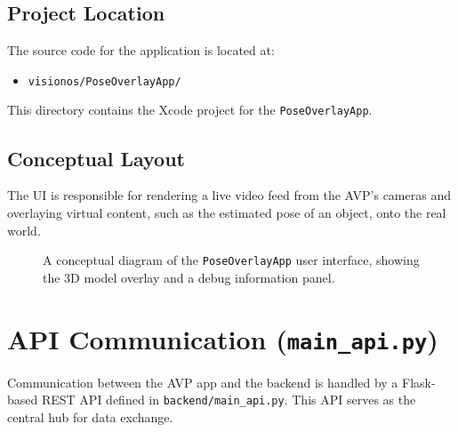 ﻿\documentclass{article}
\newcommand{\filepath}[1]{\texttt{\small #1}}
\begin{document}
\subsection{Project Location}
The source code for the application is located at:
\begin{itemize}
    \item \filepath{visionos/PoseOverlayApp/}
\end{itemize}
This directory contains the Xcode project for the \texttt{PoseOverlayApp}.

\subsection{Conceptual Layout}
The UI is responsible for rendering a live video feed from the AVP's cameras and overlaying virtual content, such as the estimated pose of an object, onto the real world.

\begin{figure}[h!]
\centering
{}
\caption{A conceptual diagram of the \texttt{PoseOverlayApp} user interface, showing the 3D model overlay and a debug information panel.}
\label{fig:ui_concept}
\end{figure}

\section{API Communication (\texttt{main_api.py})}
Communication between the AVP app and the backend is handled by a Flask-based REST API defined in \filepath{backend/main_api.py}. This API serves as the central hub for data exchange.
\end{document}
